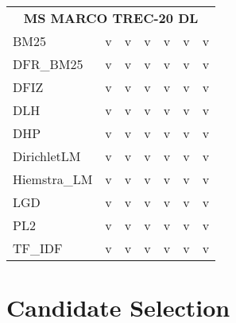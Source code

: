 \begin{longtable}{lcccccc}
    \multicolumn{7}{c}{\textbf{MS MARCO TREC-20 DL}} \\
    BM25         & v & v & v & v & v & v \\
    DFR\_BM25    & v & v & v & v & v & v \\
    DFIZ         & v & v & v & v & v & v \\
    DLH          & v & v & v & v & v & v \\
    DHP          & v & v & v & v & v & v \\
    DirichletLM  & v & v & v & v & v & v \\
    Hiemstra\_LM & v & v & v & v & v & v \\
    LGD          & v & v & v & v & v & v \\
    PL2          & v & v & v & v & v & v \\
    TF\_IDF      & v & v & v & v & v & v \\
    \midrule

    \bottomrule
\end{longtable}

\section{Candidate Selection}\label{eval-candidate-selection}

